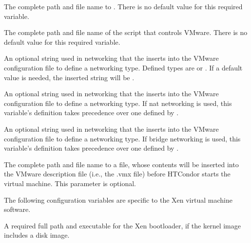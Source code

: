 \begin{description}
\label{param:VMwarePerl}
\item[\Macro{VMWARE\_PERL}]
  The complete path and file name to .
  There is no default value for this required variable.

\label{param:VMwareScript}
\item[\Macro{VMWARE\_SCRIPT}]
  The complete path and file name of the script that controls VMware.
  There is no default value for this required variable.

\label{param:VMwareNetworkingType}
\item[\Macro{VMWARE\_NETWORKING\_TYPE}]
  An optional string used in networking that the 
  inserts into the VMware configuration file to define a networking type.
  Defined types are  or .
  If a default value is needed, the inserted string will be .

\label{param:VMwareNatNetworkingType}
\item[\Macro{VMWARE\_NAT\_NETWORKING\_TYPE}]
  An optional string used in networking that the 
  inserts into the VMware configuration file to define a networking type.
  If nat networking is used, this variable's definition takes
  precedence over one defined by .

\label{param:VMwareBridgeNetworkingType}
\item[\Macro{VMWARE\_BRIDGE\_NETWORKING\_TYPE}]
  An optional string used in networking that the 
  inserts into the VMware configuration file to define a networking type.
  If bridge networking is used, this variable's definition takes
  precedence over one defined by .

\label{param:VMwareLocalSettingsFile}
\item[\Macro{VMWARE\_LOCAL\_SETTINGS\_FILE}]
  The complete path and file name to a file, whose contents will be
  inserted into the VMware description file (i.e., the .vmx file) before
  HTCondor starts the virtual machine. This parameter is optional.

\end{description}

The following configuration variables are specific to the Xen
virtual machine software.

\begin{description}

\label{param:XenBootloader}
\item[\Macro{XEN\_BOOTLOADER}]
  A required full path and executable for the Xen bootloader,
  if the kernel image includes a disk image.

\end{description}

